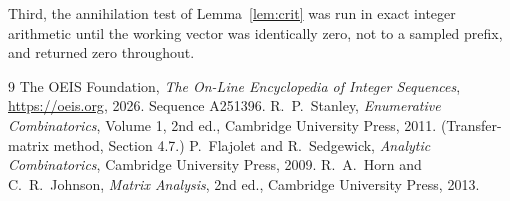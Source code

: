 \documentclass[11pt,a4paper]{article}
\theoremstyle{plain}
\theoremstyle{definition}
\begin{document}
Third, the annihilation test of Lemma~\ref{lem:crit} was run in exact integer arithmetic
until the working vector was identically zero, not to a sampled prefix, and returned zero
throughout.

\begin{thebibliography}{9}
 The OEIS Foundation, \emph{The On-Line Encyclopedia of Integer
Sequences}, \url{https://oeis.org}, 2026. Sequence A251396.
 R.~P.~Stanley, \emph{Enumerative Combinatorics}, Volume 1, 2nd ed.,
Cambridge University Press, 2011. (Transfer-matrix method, Section 4.7.)
 P.~Flajolet and R.~Sedgewick, \emph{Analytic Combinatorics}, Cambridge
University Press, 2009.
 R.~A.~Horn and C.~R.~Johnson, \emph{Matrix Analysis}, 2nd ed., Cambridge
University Press, 2013.
\end{thebibliography}
\end{document}
